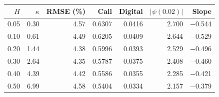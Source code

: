 \begin{tabular}{rrrrrrr}
\toprule
$H$ & $\kappa$ & RMSE (\%) & Call & Digital & $|\psi(0.02)|$ & Slope\\
\midrule
0.05 & 0.30 & 4.57 & 0.6307 & 0.0416 & 2.700 & $-$0.544\\
0.10 & 0.61 & 4.49 & 0.6205 & 0.0409 & 2.644 & $-$0.529\\
0.20 & 1.44 & 4.38 & 0.5996 & 0.0393 & 2.529 & $-$0.496\\
0.30 & 2.64 & 4.35 & 0.5787 & 0.0375 & 2.408 & $-$0.460\\
0.40 & 4.39 & 4.42 & 0.5586 & 0.0355 & 2.285 & $-$0.421\\
0.50 & 6.99 & 4.58 & 0.5404 & 0.0334 & 2.157 & $-$0.379\\
\bottomrule
\end{tabular}

